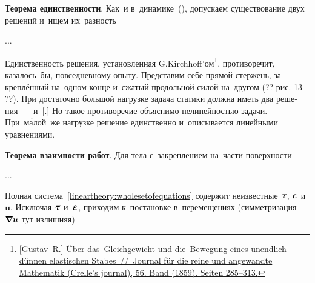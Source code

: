 \begin{otherlanguage}{russian}
\textbf{Теорема единственности}. Как~и в~динамике~(), допускаем существование двух решений и~ищем их~разность

...

Единственность решения, установленная G.\:Kirchhoff’ом\footnote{[Gustav~R.] \href{https://opacplus.bsb-muenchen.de/Vta2/bsb10525510/bsb:2960444?page=291}{Über das~Gleichgewicht und die~Bewegung eines unendlich dünnen elastischen Stabes~//~Journal für die reine und angewandte Mathematik (Crelle’s journal), 56. Band (1859). Seiten 285\hbox{--}313.}}\hspace{-0.8ex}, противоречит, казалось~бы, повседневному опыту. Представим себе прямой стержень, закреплённый на~одном конце и~сжатый продольной силой на~другом (?? рис. 13 ??). При достаточно большой нагрузке задача статики должна иметь два решения~---  и~[.] Но такое противоречие объяснимо нелинейностью задачи. При~м\'{а}лой~же нагрузке решение единственно и~описывается линейными уравнениями.

\textbf{Теорема взаимности работ}. Для тела с~закреплением на~части поверхности

...





\label{para:equationsfordisplacement}

Полная система~\eqref{lineartheory:wholesetofequations} содержит неизвестные $\mathboldtau$, $\mathboldepsilon$ и~$\bm{u}$. Исключая $\mathboldtau$ и~$\mathboldepsilon$, приходим к~постановке в~перемещениях (симметризация~${\bm{\nabla}\hspace{-0.2ex} \bm{u}}$ тут излишняя)


\end{otherlanguage}
